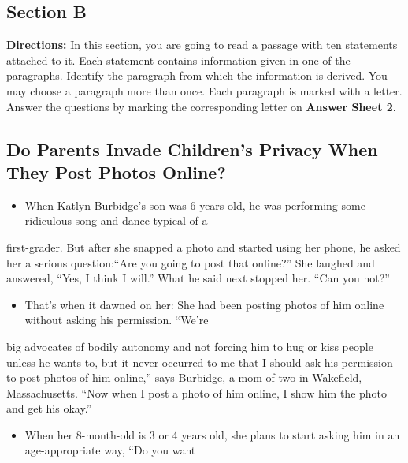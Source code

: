 \documentclass[UTF8,11pt]{ctexart}
\begin{document}
\subsection*{\textbf{Section B}}


\textbf{Directions:} In this section, you are going to read a passage with ten statements attached to it. Each statement contains information given in one of the paragraphs. Identify the paragraph from which the information is derived. You may choose a paragraph more than once. Each paragraph is marked with a letter. Answer the questions by marking the corresponding letter on\textbf{ Answer Sheet 2}.


\subsection*{\textbf{Do Parents Invade Children’s Privacy When They Post Photos Online?}}


\begin{itemize}[leftmargin=2em,itemsep=.2em,topsep=.4em]\item[A.] When Katlyn Burbidge’s son was 6 years old, he was performing some ridiculous song and dance typical of a
\end{itemize}

first-grader. But after she snapped a photo and started using her phone, he asked her a serious question:“Are you going to post that online?” She laughed and answered, “Yes, I think I will.” What he said next stopped her. “Can you not?”


\begin{itemize}[leftmargin=2em,itemsep=.2em,topsep=.4em]\item[B.] That’s when it dawned on her: She had been posting photos of him online without asking his permission. “We’re
\end{itemize}

big advocates of bodily autonomy and not forcing him to hug or kiss people unless he wants to, but it never occurred to me that I should ask his permission to post photos of him online,” says Burbidge, a mom of two in Wakefield, Massachusetts. “Now when I post a photo of him online, I show him the photo and get his okay.”


\begin{itemize}[leftmargin=2em,itemsep=.2em,topsep=.4em]\item[C.] When her 8-month-old is 3 or 4 years old, she plans to start asking him in an age-appropriate way, “Do you want
\end{itemize}
\end{document}
